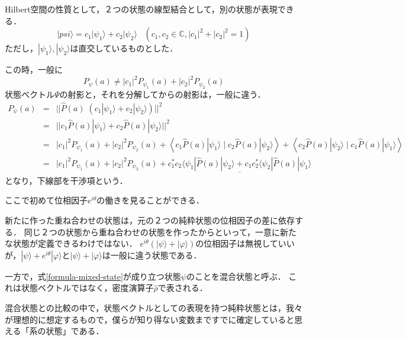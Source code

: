 \documentclass[uplatex, dvipdfmx]{jsreport}
\begin{document}
\begin{definition}
    Hilbert空間の性質として，２つの状態の線型結合として，別の状態が表現できる．
    \[ |psi\rangle = c_1|\psi_1\rangle + c_2|\psi_2\rangle\;\;\; (c_1,c_2\in\mathbb{C}, |c_1|^2+|c_2|^2=1) \]
    ただし，$|\psi_1\rangle,|\psi_2\rangle$は直交しているものとした．
\end{definition}

\begin{proposition}
    この時，一般に
    \begin{equation}\label{formula-mixed-state}
        P_\psi(a)\ne |c_1|^2P_{\psi_1}(a) + |c_2|^2P_{\psi_2}(a)
    \end{equation}
    状態ベクトル$\Psi$の射影と，それを分解してからの射影は，一般に違う．
    \begin{eqnarray*}
        P_\psi(a)&=& ||\hat{P}(a)\;(c_1|\psi_1\rangle + c_2|\psi_2\rangle)||^2 \\
        &=& || c_1\hat{P}(a)|\psi_1\rangle + c_2\hat{P}(a)|\psi_2\rangle ||^2 \\
        &=& |c_1|^2P_{\psi_1}(a) + |c_2|^2P_{\psi_2}(a) + \left\langle c_1\hat{P}(a)|\psi_1\rangle\mid c_2\hat{P}(a)|\psi_2\rangle\right\rangle + \left\langle c_2\hat{P}(a)|\psi_2\rangle\mid c_1\hat{P}(a)|\psi_1\rangle\right\rangle \\
        &=& |c_1|^2P_{\psi_1}(a) + |c_2|^2P_{\psi_2}(a) + \underline{c_1^*c_2\langle\psi_1|\hat{P}(a)|\psi_2\rangle + c_1c_2^*\langle\psi_2|\hat{P}(a)|\psi_1\rangle}
    \end{eqnarray*}
    となり，下線部を干渉項という．
\end{proposition}
\begin{remark}
    ここで初めて位相因子$e^{i\theta}$の働きを見ることができる．

    新たに作った重ね合わせの状態は，元の２つの純粋状態の位相因子の差に依存する．
    同じ２つの状態から重ね合わせの状態を作ったからといって，一意に新たな状態が定義できるわけではない．
    $e^{i\theta}(|\psi\rangle +|\varphi\rangle)$の位相因子は無視していいが，$|\psi\rangle +e^{i\theta}|\varphi\rangle$と$|\psi\rangle +|\varphi\rangle$は一般に違う状態である．
\end{remark}
\begin{definition}
    一方で，式\ref{formula-mixed-state}が成り立つ状態$\psi$のことを混合状態と呼ぶ．
    これは状態ベクトルではなく，密度演算子$\hat{\rho}$で表される．

    混合状態との比較の中で，状態ベクトルとしての表現を持つ純粋状態とは，我々が理想的に想定するもので，僕らが知り得ない変数まですでに確定していると思える「系の状態」である．
\end{definition}
\end{document}
